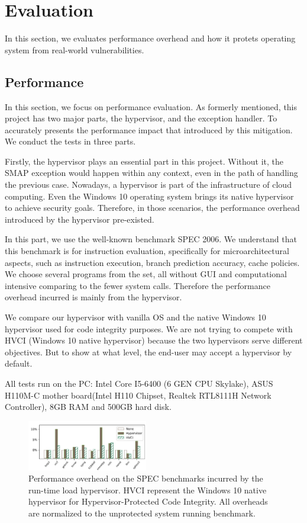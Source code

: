 
\section{Evaluation}
\label{sec:evaluation}

In this section, we evaluates performance overhead and how it protets  operating system from real-world vulnerabilities.

\subsection{Performance}
In this section, we focus on performance evaluation. 
As formerly mentioned, this project has two major parts, the hypervisor, and the exception handler. To accurately presents the performance impact that introduced by this mitigation. We conduct the tests in three parts.

Firstly, the hypervisor plays an essential part in this project. Without it, the SMAP exception would happen within any context, even in the path of handling the previous case. Nowadays, a hypervisor is part of the infrastructure of cloud computing. Even the Windows 10 operating system brings its native hypervisor to achieve security goals.  Therefore, in those scenarios,  the performance overhead introduced by the hypervisor pre-existed. 

In this part, we use the well-known benchmark SPEC 2006. We understand that this benchmark is for instruction evaluation, specifically for microarchitectural aspects, such as instruction execution, branch prediction accuracy, cache policies. We choose several programs from the set, all without GUI and computational intensive comparing to the fewer system calls. Therefore the performance overhead incurred is mainly from the hypervisor.

We compare our hypervisor with vanilla OS and the native Windows 10 hypervisor used for code integrity purposes. We are not trying to compete with HVCI (Windows 10 native hypervisor) because the two hypervisors serve different objectives. But to show at what level, the end-user may accept a hypervisor by default.


All tests run on the PC: Intel Core I5-6400 (6 GEN CPU Skylake), ASUS H110M-C mother board(Intel H110 Chipset, Realtek RTL8111H Network Controller), 8GB RAM and 500GB hard disk.


\begin{figure}[th]
  \includegraphics[width=0.47\textwidth]{figures/benchmark3}
  \centering
  \caption{Performance overhead on the SPEC benchmarks incurred by the run-time load hypervisor. HVCI represent the Windows 10 native hypervisor for Hypervisor-Protected Code Integrity. All overheads are normalized to the unprotected system running benchmark.}
  \label{fig:benchmark}
\end{figure}

